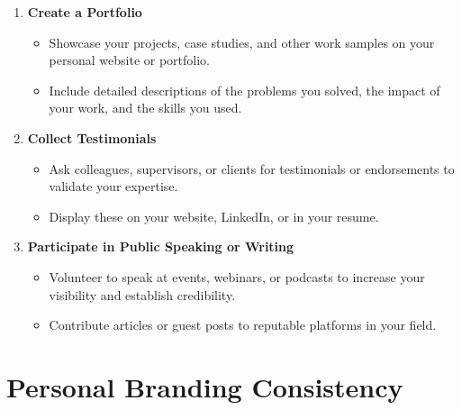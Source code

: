 \documentclass[
  letterpaper,
  DIV=11,
  numbers=noendperiod]{scrreprt}
\providecommand{\tightlist}{%
  \setlength{\itemsep}{0pt}\setlength{\parskip}{0pt}}\usepackage{longtable,booktabs,array}
\begin{document}
\begin{enumerate}
\def\labelenumi{\arabic{enumi}.}
\item
  \textbf{Create a Portfolio}

  \begin{itemize}
  \tightlist
  \item
    Showcase your projects, case studies, and other work samples on your
    personal website or portfolio.
  \item
    Include detailed descriptions of the problems you solved, the impact
    of your work, and the skills you used.
  \end{itemize}
\item
  \textbf{Collect Testimonials}

  \begin{itemize}
  \tightlist
  \item
    Ask colleagues, supervisors, or clients for testimonials or
    endorsements to validate your expertise.
  \item
    Display these on your website, LinkedIn, or in your resume.
  \end{itemize}
\item
  \textbf{Participate in Public Speaking or Writing}

  \begin{itemize}
  \tightlist
  \item
    Volunteer to speak at events, webinars, or podcasts to increase your
    visibility and establish credibility.
  \item
    Contribute articles or guest posts to reputable platforms in your
    field.
  \end{itemize}
\end{enumerate}

\section{Personal Branding
Consistency}\label{personal-branding-consistency}
\end{document}
